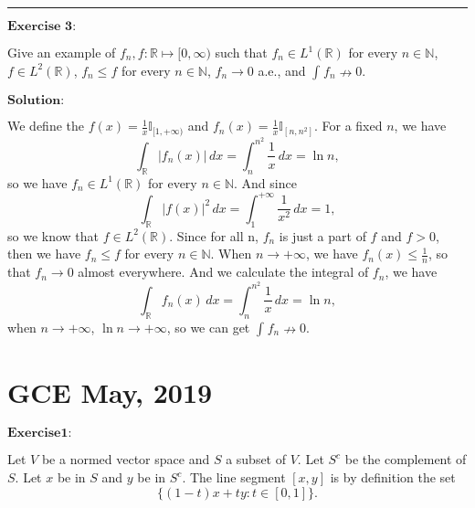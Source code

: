 \documentclass[12pt]{article}
\begin{document}
\noindent\rule[0.25\baselineskip]{\textwidth}{0.5pt}

\vspace{8pt}

$\textbf{Exercise 3:}$

Give an example of $f_n, f : \mathbb{R} \mapsto [0, \infty)$ such that $f_{n} \in L^{1}(\mathbb{R})$ for every $n \in \mathbb{N}$, $f \in L^{2}(\mathbb{R})$, $f_{n} \leq f$ for every $n \in \mathbb{N}$, $f_{n} \to 0$ a.e., and $\int_{}^{} f_{n} \nrightarrow 0$.

\vspace{8pt}
$\textbf{Solution:}$

We define the $f(x) = \frac{1}{x} \mathbb{I}_{[1, +\infty)}$ and $f_{n}(x) = \frac{1}{x} \mathbb{I}_{[n, n^{2}]}$. For a fixed $n$, we have
\begin{equation*}
\int_{\mathbb{R}}^{} |f_{n}(x)| \, d x = \int_{n}^{n^{2}} \frac{1}{x} \, d x = \ln{n},
\end{equation*}
so we have $f_{n} \in L^{1}(\mathbb{R})$ for every $n \in \mathbb{N}$. And since
\begin{equation*}
\int_{\mathbb{R}}^{} |f(x)|^{2} \, d x = \int_{1}^{+ \infty} \frac{1}{x^{2}} \, d x = 1,
\end{equation*}
so we know that $f \in L^{2}(\mathbb{R})$. Since for all n, $f_{n}$ is just a part of $f$ and $f > 0$, then we have $f_{n} \leq f$ for every $n \in \mathbb{N}$. When $n \to +\infty$, we have $f_{n}(x) \leq \frac{1}{n}$, so that $f_{n} \to 0$ almost everywhere. And we calculate the integral of $f_{n}$, we have
\begin{equation*}
\int_{\mathbb{R}}^{} f_{n}(x) \, d x = \int_{n}^{n^{2}} \frac{1}{x} \, d x = \ln{n},
\end{equation*}
when $n \to + \infty$, $\ln{n} \to + \infty$, so we can get $\int_{}^{} f_{n} \nrightarrow 0$.

\newpage


\section{GCE May, 2019}

$\textbf{Exercise1:}$

Let $V$ be a normed vector space and $S$ a subset of $V$. Let $S^{c}$ be the complement of $S$. Let $x$ be in $S$ and $y$ be in $S^{c}$. The line segment $[x, y]$ is by definition the set
\begin{equation*}
    \{(1-t)x + t y : t \in [0, 1] \}.
\end{equation*}
\end{document}
